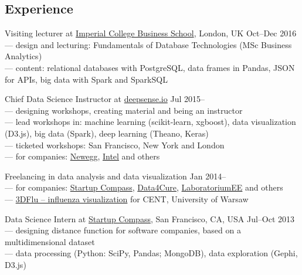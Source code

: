 \documentclass[margin,line]{resume}
\begin{document}
\begin{resume}
    \section{\mysidestyle Experience}

    \begin{list2}

    \item Visiting lecturer at \href{https://wwwf.imperial.ac.uk/business-school/}{Imperial College Business School}, London, UK \hfill Oct--Dec 2016\\
        --- design and lecturing: Fundamentals of Database Technologies (MSc Business Analytics)\\
        --- content: relational databases with PostgreSQL, data frames in Pandas, JSON for APIs, big data with Spark and SparkSQL

    \item Chief Data Science Instructor at \href{http://workshops.deepsense.io}{deepsense.io} \hfill Jul 2015--\\
        --- designing workshops, creating material and being an instructor\\
        --- lead workshops in: machine learning (scikit-learn, xgboost), data visualization (D3.js), big data (Spark), deep learning (Theano, Keras)\\
        --- ticketed workshops: San Francisco, New York and London\\
        --- for companies: \href{http://www.newegg.com/}{Newegg}, \href{http://www.intel.com}{Intel} and others

    \item Freelancing in data analysis and data visualization  \hfill Jan 2014--\\
        --- for companies: \href{http://compass.co}{Startup Compass}, \href{http://www.data4cure.com/}{Data4Cure}, \href{https://laboratorium.ee/en}{LaboratoriumEE} and others\\
        --- \href{http://nucleus3d.cent.uw.edu.pl/influenza/}{3DFlu -- influenza visualization} for CENT, University of Warsaw

    \item Data Science Intern at \href{http://compass.co}{Startup Compass}, San Francisco, CA, USA \hfill Jul--Oct 2013\\
        --- designing distance function for software companies, based on a multidimensional dataset\\
        --- data processing (Python: SciPy, Pandas; MongoDB), data exploration (Gephi, D3.js)


\end{list2}
\end{resume}
\end{document}
